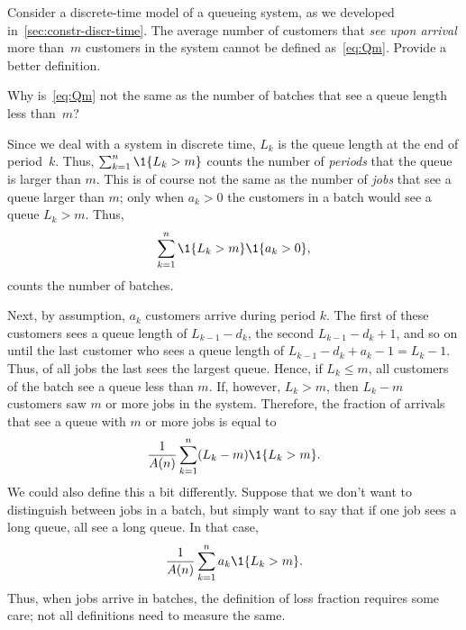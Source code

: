 \begin{exercise}
  Consider a discrete-time model of a queueing system, as we developed in~\cref{sec:constr-discr-time}.
  The average number of customers that \emph{see upon arrival} more than~$m$ customers in the system cannot be defined as~\cref{eq:Qm}.
  Provide a better definition.
\begin{hint}
    Why is~\cref{eq:Qm} not the same as the number of batches that see a queue length less than~$m$?
\end{hint}
\begin{solution} Since we deal with a system in discrete time, $L_k$ is the queue length at the end of period~$k$.
    Thus, $\sum_{k=1}^n \1{L_k > m}$ counts the number of \emph{periods} that the queue is larger than $m$.
    This is of course not the same as the number of \emph{jobs} that see a queue larger than $m$; only when $a_k>0$ the customers in a batch would see a queue $L_k>m$.
    Thus,
    \begin{equation*}
      \sum_{k=1}^n \1{L_k > m} \1{a_k > 0},
    \end{equation*}
    counts the number of batches. 

    Next, by assumption, $a_k$ customers arrive during period $k$.
    The first of these customers sees a queue length of $L_{k-1} - d_k$, the second $L_{k-1}-d_k + 1$, and so on until the last customer who sees a queue length of $L_{k-1} - d_k + a_k -1 = L_k -1$.
    Thus, of all jobs the last sees the largest queue.
    Hence, if $L_k \leq m$, all customers of the batch see a queue less than $m$.
    If, however, $L_k > m$, then $L_k -m$ customers saw $m$ or more jobs in the system.
    Therefore, the fraction of arrivals that see a queue with $m$ or more jobs is equal to
\begin{equation*}
  \frac 1 {A(n)} \sum_{k=1}^n (L_k - m) \1{L_k > m} .
\end{equation*}
We could also define this a bit differently.
Suppose that we don't want to distinguish between jobs in a batch, but simply want to say that if one job sees a long queue, all see a long queue.
In that case,
\begin{equation*}
\frac 1{A(n)}\sum_{k=1}^n a_k \1{L_k > m}.
\end{equation*}
Thus, when jobs arrive in batches, the definition of loss fraction requires some care; not all definitions need to measure the same.
\end{solution}
\end{exercise}






  



